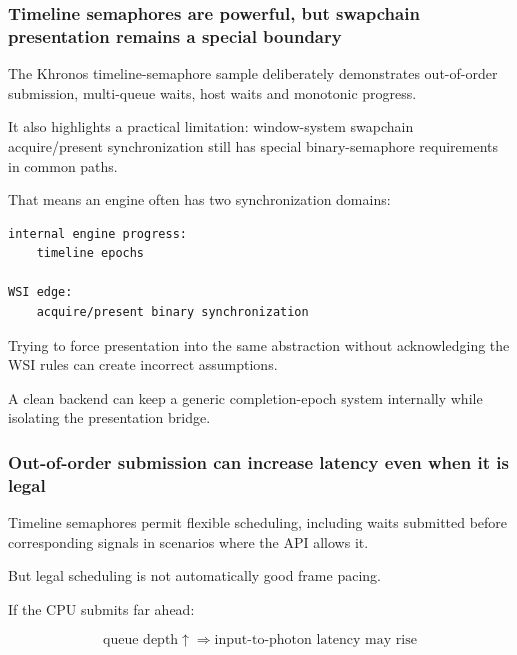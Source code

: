 \subsubsection{Timeline semaphores are powerful, but swapchain presentation remains a special boundary}\label{05-engine-i-ch023-timeline-semaphores-are-powerful-but-swapchain-presentation-remains-a-special-boundary}

\hypertarget{05-engine-i-ch023-timeline-semaphores-are-powerful-but-swapchain-presentation-remains-a-special-boundary}{}

The Khronos timeline-semaphore sample deliberately demonstrates out-of-order submission, multi-queue waits, host waits and monotonic progress.

It also highlights a practical limitation: window-system swapchain acquire/present synchronization still has special binary-semaphore requirements in common paths.

That means an engine often has two synchronization domains:

\begin{verbatim}
internal engine progress:
    timeline epochs

WSI edge:
    acquire/present binary synchronization
\end{verbatim}

Trying to force presentation into the same abstraction without acknowledging the WSI rules can create incorrect assumptions.

A clean backend can keep a generic completion-epoch system internally while isolating the presentation bridge.

\subsubsection{Out-of-order submission can increase latency even when it is legal}\label{05-engine-i-ch023-out-of-order-submission-can-increase-latency-even-when-it-is-legal}

\hypertarget{05-engine-i-ch023-out-of-order-submission-can-increase-latency-even-when-it-is-legal}{}

Timeline semaphores permit flexible scheduling, including waits submitted before corresponding signals in scenarios where the API allows it.

But legal scheduling is not automatically good frame pacing.

If the CPU submits far ahead:

\[
\text{queue depth}\uparrow
\Rightarrow
\text{input-to-photon latency may rise}
\]

